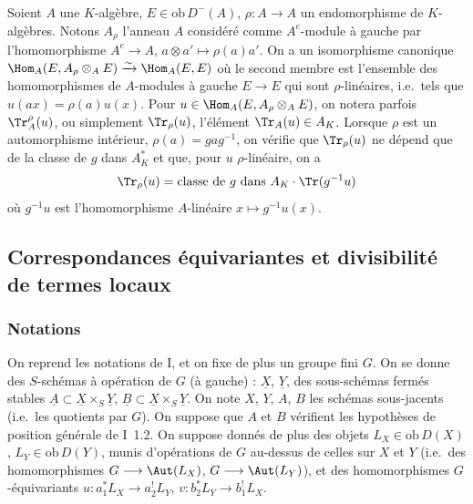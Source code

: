 \subsubsection{}

\begin{para}
Soient $A$ une $K$-alg\`ebre, $E \in \text{ob}\,D^-(A)$, $\rho : A \longrightarrow A$ un endomorphisme de $K$-alg\`ebres. Notons $A_\rho$ l'anneau $A$ consid\'er\'e comme $A^e$-module \`a gauche par l'homomorphisme $A^e \longrightarrow A$, $a \otimes a' \mapsto \rho(a)a'$. On a un isomorphisme canonique $\Hom_A(E, A_\rho \otimes_A E) \xrightarrow{\sim} \Hom_A(E, E)$ o\`u le second membre est l'ensemble des homomorphismes de $A$-modules \`a gauche $E \longrightarrow E$ qui sont $\rho$-lin\'eaires, i.e.\ tels que $u(ax) = \rho(a)u(x)$. Pour $u \in \Hom_A(E, A_\rho \otimes_A E)$, on notera parfois $\Tr_A^\rho(u)$, ou simplement $\Tr_\rho(u)$, l'\'el\'ement $\Tr_A(u) \in A_K$. Lorsque $\rho$ est un automorphisme int\'erieur, $\rho(a) = gag^{-1}$, on v\'erifie que $\Tr_\rho(u)$ ne d\'epend que de la classe de $g$ dans $A_K^*$ et que, pour $u$ $\rho$-lin\'eaire, on a
\begin{equation}\label{eq:5.13.1}
\Tr_\rho(u) = \text{classe de } g \text{ dans } A_K \cdot \Tr(g^{-1}u)
\end{equation}
o\`u $g^{-1}u$ est l'homomorphisme $A$-lin\'eaire $x \mapsto g^{-1}u(x)$.
\end{para}

\newpage

\subsection{Correspondances \'equivariantes et divisibilit\'e de termes locaux}

\subsubsection{Notations}

\begin{para}
On reprend les notations de I, et on fixe de plus un groupe fini $G$. On se donne des $S$-sch\'emas \`a op\'eration de $G$ (\`a gauche) : $\underline{X}$, $\underline{Y}$, des sous-sch\'emas ferm\'es stables $\underline{A} \subset \underline{X} \times_S \underline{Y}$, $\underline{B} \subset \underline{X} \times_S \underline{Y}$. On note $X$, $Y$, $A$, $B$ les sch\'emas sous-jacents (i.e.\ les quotients par $G$). On suppose que $A$ et $B$ v\'erifient les hypoth\`eses de position g\'en\'erale de I~1.2. On suppose donn\'es de plus des objets $L_X \in \text{ob}\,D(X)$, $L_Y \in \text{ob}\,D(Y)$, munis d'op\'erations de $G$ au-dessus de celles sur $X$ et $Y$ (i.e.\ des homomorphismes $G \longrightarrow \Aut(L_X)$, $G \longrightarrow \Aut(L_Y)$), et des homomorphismes $G$-\'equivariants $u : a_1^*L_X \longrightarrow a_2^!L_Y$, $v : b_2^*L_Y \longrightarrow b_1^!L_X$.
\end{para}

